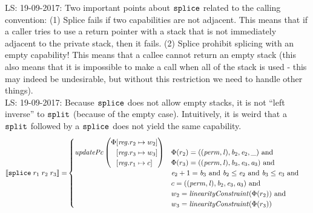 \documentclass[a3paper]{article}
\newcommand\lau[1]{{\color{purple} \sf \footnotesize {LS: #1}}\\}
\newcommand{\sem}[1]{\left\llbracket #1 \right\rrbracket}
\newcommand{\tand}{\text{ and }}
\newcommand{\targetcolor}[1]{\color{black}}
\newcommand{\trg}[1]{{\targetcolor{} #1}}
\newcommand{\zinstr}[1]{\texttt{#1}}
\newcommand{\threeinstr}[4]{
  \ifthenelse{\equal{#2#3#4}{}}
  {\zinstr{#1}}
  {\zinstr{#1} \; #2 \; #3 \; #4}
}
\newcommand{\fourinstr}[5]{
  \ifthenelse{\equal{#2#3#4#5}{}}
  {\zinstr{#1}}
  {\zinstr{#1} \; #2 \; #3 \; #4 \; #5}
}
\newcommand{\tsplice}[3]{\threeinstr{\trg{splice}}{#1}{#2}{#3}}
\newcommand{\tsplit}[4]{\fourinstr{\trg{split}}{#1}{#2}{#3}{#4}}
\newcommand{\update}[2]{[#1 \mapsto #2]}
\newcommand{\updReg}[2]{\update{\reg.#1}{#2}}
\newcommand{\perm}{\var{perm}}
\newcommand{\lin}{\var{l}}
\newcommand{\var}[1]{\mathit{#1}}
\newcommand{\reg}{\var{reg}}
\newcommand{\baddr}{\var{b}}
\newcommand{\eaddr}{\var{e}}
\newcommand{\aaddr}{\var{a}}
\newcommand{\plainfun}[2]{
  \ifthenelse{\equal{#2}{}}
  {\mathit{#1}}
  {\mathit{#1}(#2)}
}
\newcommand{\linCons}[1]{\plainfun{linearityConstraint}{#1}}
\newcommand{\updPcAddr}[1]{\plainfun{updatePc}{#1}}
\begin{document}
\lau{19-09-2017: Two important points about $\tsplice{}{}{}$ related to the calling convention: (1) Splice fails if two capabilities are not adjacent. This means that if a caller tries to use a return pointer with a stack that is not immediately adjacent to the private stack, then it fails. (2) Splice prohibit splicing with an empty capability! This means that a callee cannot return an empty stack (this also means that it is impossible to make a call when all of the stack is used - this may indeed be undesirable, but without this restriction we need to handle other things).}
\lau{19-09-2017: Because $\tsplice{}{}{}$ does not allow empty stacks, it is not ``left inverse'' to $\tsplit{}{}{}{}$ (because of the empty case). Intuitively, it is weird that a $\tsplit{}{}{}{}$ followed by a $\tsplice{}{}{}$ does not yield the same capability.}
\begin{align*}
  \sem{\tsplice{r_1}{r_2}{r_3}} = &
                              \begin{cases}
                                \updPcAddr{}\left(
                                \arraycolsep=0pt
                                \begin{array}{r l}
                                  \Phi&\updReg{r_2}{w_2}\\
                                      &\updReg{r_3}{w_3}\\
                                      &\updReg{r_1}{c}
                                \end{array}\right)
&
                                \arraycolsep=0pt
                                \begin{array}[t]{l}
                                  \Phi(r_2) = ((\perm,\lin),\baddr_2,\eaddr_2,\_) \tand \\
                                  \Phi(r_3) = ((\perm,\lin),\baddr_3,\eaddr_3,\aaddr_3) \tand \\
                                  \eaddr_2 + 1 = \baddr_3 \tand \baddr_2 \leq \eaddr_2 \tand \baddr_3 \leq \eaddr_3 \tand \\
                                  c = ((\perm,\lin),\baddr_2,\eaddr_3,\aaddr_3) \tand\\
                                  w_2 = \linCons{\Phi(r_2)} \tand \\
                                  w_3 = \linCons{\Phi(r_3)} \\
                                \end{array}\\

\end{cases}
\end{align*}
\end{document}
